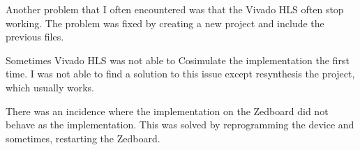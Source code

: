 Another problem that I often encountered was that the Vivado HLS often stop working. The problem was fixed by creating a new project and include the previous files.

Sometimes Vivado HLS was not able to Cosimulate the implementation the first time. I was not able to find a solution to this issue except resynthesis the project, which usually works.

There was an incidence where the implementation on the Zedboard did not behave as the implementation. This was solved by reprogramming the device and sometimes, restarting the Zedboard.

